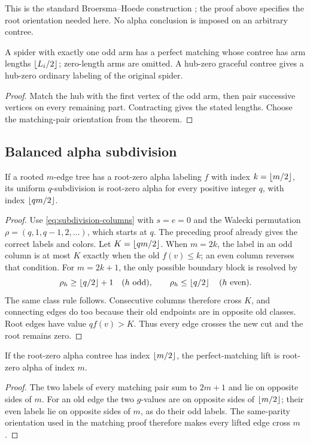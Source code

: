 This is the standard Broersma--Hoede construction
\cite{BroersmaHoede1999}; the proof above specifies the root orientation
needed here. No alpha conclusion is imposed on an arbitrary contree.

\begin{corollary}\label{common:unique-odd-contree}
A spider with exactly one odd arm has a perfect matching whose contree
has arm lengths $\left\lfloor L_i/2\right\rfloor$; zero-length arms are omitted.
A hub-zero graceful contree gives a hub-zero ordinary labeling of the
original spider.
\end{corollary}
\begin{proof}
Match the hub with the first vertex of the odd arm, then pair
successive vertices on every remaining part. Contracting gives the
stated lengths. Choose the matching-pair orientation from the theorem.
\end{proof}

\subsection{Balanced alpha subdivision}
\begin{theorem}\label{common:balanced-alpha-subdivision}
If a rooted $m$-edge tree has a root-zero alpha labeling $f$ with
index $k=\left\lfloor m/2\right\rfloor$, its uniform $q$-subdivision is root-zero alpha
for every positive integer $q$, with index $\left\lfloor qm/2\right\rfloor$.
\end{theorem}
\begin{proof}
Use \eqref{eq:subdivision-columns} with $s=e=0$ and the Walecki
permutation $\rho=(q,1,q-1,2,\ldots)$, which starts at $q$.
The preceding proof already gives the correct labels and colors.
Let $K=\left\lfloor qm/2\right\rfloor$. When $m=2k$, the label in an odd column is
at most $K$ exactly when the old $f(v)\le k$; an even column reverses
that condition. For $m=2k+1$, the only possible boundary block is
resolved by
\[
 \rho_h\ge\left\lfloor q/2\right\rfloor+1\quad(h\text{ odd}),\qquad
 \rho_h\le\left\lfloor q/2\right\rfloor\quad(h\text{ even}).
\]
The same class rule follows. Consecutive columns therefore cross
$K$, and connecting edges do too because their old endpoints are in
opposite old classes. Root edges have value $qf(v)>K$. Thus every
edge crosses the new cut and the root remains zero.
\end{proof}

\begin{corollary}\label{common:balanced-alpha-matching}
If the root-zero alpha contree has index $\left\lfloor m/2\right\rfloor$, the
perfect-matching lift is root-zero alpha of index $m$.
\end{corollary}
\begin{proof}
The two labels of every matching pair sum to $2m+1$ and lie on
opposite sides of $m$. For an old edge the two $g$-values are on
opposite sides of $\left\lfloor m/2\right\rfloor$; their even labels lie on opposite
sides of $m$, as do their odd labels. The same-parity orientation used
in the matching proof therefore makes every lifted edge cross $m$.
\end{proof}

